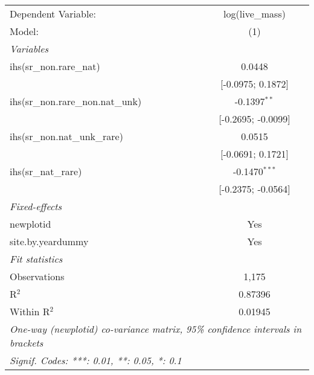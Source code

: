 \begin{tabular}{lc}
\tabularnewline\midrule\midrule
Dependent Variable:&log(live\_mass)\\
Model:&(1)\\
\midrule \emph{Variables}&  \\
ihs(sr\_non.rare\_nat)&0.0448\\
  &[-0.0975; 0.1872]\\
ihs(sr\_non.rare\_non.nat\_unk)&-0.1397$^{**}$\\
  &[-0.2695; -0.0099]\\
ihs(sr\_non.nat\_unk\_rare)&0.0515\\
  &[-0.0691; 0.1721]\\
ihs(sr\_nat\_rare)&-0.1470$^{***}$\\
  &[-0.2375; -0.0564]\\
\midrule \emph{Fixed-effects}&  \\
newplotid & Yes\\
site.by.yeardummy & Yes\\
\midrule \emph{Fit statistics}&  \\
Observations & 1,175\\
R$^2$ & 0.87396\\
Within R$^2$ & 0.01945\\
\midrule\midrule\multicolumn{2}{l}{\emph{One-way (newplotid) co-variance matrix, 95\% confidence intervals in brackets}}\\
\multicolumn{2}{l}{\emph{Signif. Codes: ***: 0.01, **: 0.05, *: 0.1}}\\
\end{tabular}


